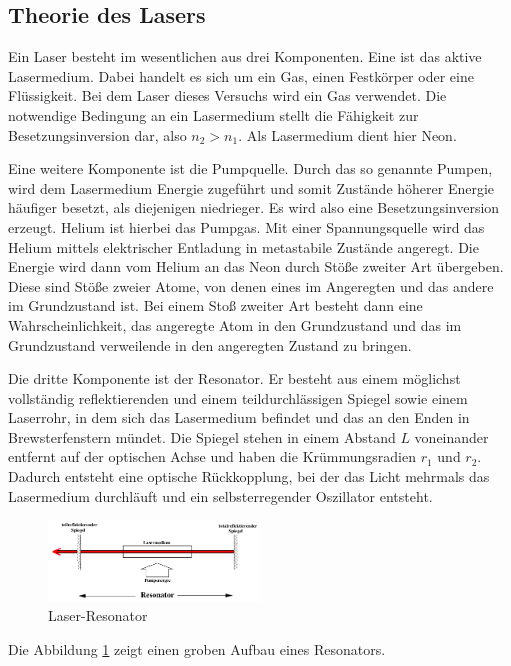 \subsection{Theorie des Lasers}
Ein Laser besteht im wesentlichen aus drei Komponenten. Eine ist das aktive Lasermedium. Dabei handelt es sich um ein Gas, einen Festkörper oder eine Flüssigkeit. Bei dem Laser dieses Versuchs wird ein Gas verwendet. Die notwendige Bedingung an ein Lasermedium stellt die Fähigkeit zur Besetzungsinversion dar, also \(n_2>n_1\). Als Lasermedium dient hier Neon.

\noindent Eine weitere Komponente ist die Pumpquelle. Durch das so genannte Pumpen, wird dem Lasermedium Energie zugeführt und somit Zustände höherer Energie häufiger besetzt, als diejenigen niedrieger. Es wird also eine Besetzungsinversion erzeugt. Helium ist hierbei das Pumpgas. Mit einer Spannungsquelle wird das Helium mittels elektrischer Entladung in metastabile Zustände angeregt. Die Energie wird dann vom Helium an das Neon durch Stöße zweiter Art übergeben. Diese sind Stöße zweier Atome, von denen eines im Angeregten und das andere im Grundzustand ist. Bei einem Stoß zweiter Art besteht dann eine Wahrscheinlichkeit, das angeregte Atom in den Grundzustand und das im Grundzustand verweilende in den angeregten Zustand zu bringen. 

\noindent Die dritte Komponente ist der Resonator. Er besteht aus einem möglichst vollständig reflektierenden und einem teildurchlässigen Spiegel sowie einem Laserrohr, in dem sich das Lasermedium befindet und das an den Enden in Brewsterfenstern mündet. Die Spiegel stehen in einem Abstand \(L\)  voneinander entfernt auf der optischen Achse und haben die Krümmungsradien \(r_1\) und \(r_2\). Dadurch entsteht eine optische Rückkopplung, bei der das Licht mehrmals das Lasermedium durchläuft und ein selbsterregender Oszillator entsteht. 

\begin{figure}
	\centering
	\includegraphics[width=0.5\textwidth]{img/resonator}
	\caption{Laser-Resonator \cite{V61}}
	\label{fig:resonator}
\end{figure}

\noindent Die Abbildung \ref{fig:resonator} zeigt einen groben Aufbau eines Resonators.

